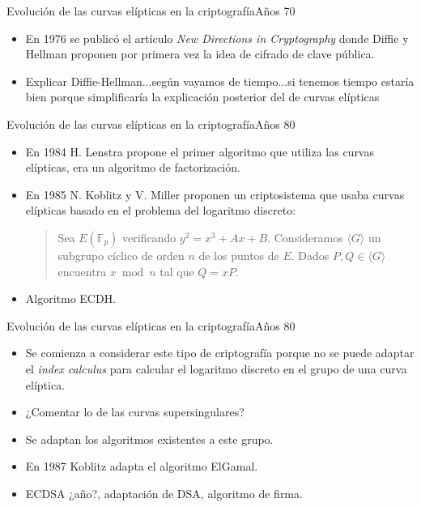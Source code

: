 \documentclass[spanish]{beamer}
\begin{document}
\begin{frame}[fragile]{Evolución de las curvas elípticas en la criptografía}{Años 70}
  \begin{itemize}
  \item En 1976 se publicó el artículo \textit{New Directions in Cryptography} donde Diffie y Hellman proponen por primera vez la idea de cifrado de clave pública. %
   \item Explicar Diffie-Hellman...según vayamos de tiempo...si tenemos tiempo estaría bien porque simplificaría la explicación posterior del de curvas elípticas
  \end{itemize}
\end{frame}

\begin{frame}[fragile]{Evolución de las curvas elípticas en la criptografía}{Años 80}
\begin{itemize}
\item En 1984 H. Lenstra propone el primer algoritmo que utiliza las curvas elípticas, era un algoritmo de factorización.
\item En 1985 N. Koblitz y V. Miller proponen un criptosistema que usaba curvas elípticas basado en el problema del logaritmo discreto:
\begin{quote}
  Sea $E(\mathbb{F}_p)$ verificando $y^2 =x^3 + Ax + B$. Consideramos $\langle G \rangle$ un subgrupo cíclico de orden $n$ de los puntos de $E$. Dados $P,Q \in \langle G \rangle$ encuentra $x \bmod{n}$ tal que $Q=xP$.
  \end{quote}
\item Algoritmo ECDH. 
\end{itemize}
\end{frame}

\begin{frame}[fragile]{Evolución de las curvas elípticas en la criptografía}{Años 80}
\begin{itemize}
\item Se comienza a considerar este tipo de criptografía porque no se puede adaptar el \textit{index calculus} para calcular el logaritmo discreto en el grupo de una curva elíptica.
\item ¿Comentar lo de las curvas supersingulares?
\item Se adaptan los algoritmos existentes a este grupo.
\item En 1987 Koblitz adapta el algoritmo ElGamal.
\item ECDSA ¿año?, adaptación de DSA, algoritmo de firma.
\end{itemize}
\end{frame}
\end{document}
